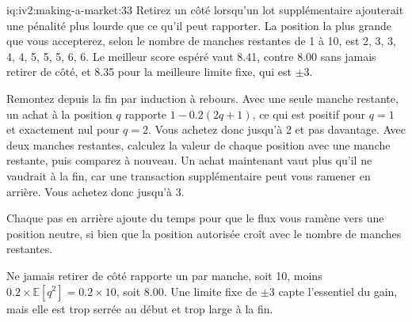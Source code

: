 \begin{solution}{iq:iv2:making-a-market:33}
Retirez un côté lorsqu'un lot supplémentaire ajouterait une pénalité plus lourde que ce qu'il peut rapporter. La position la plus grande que vous accepterez, selon le nombre de manches restantes de 1 à 10, est 2, 3, 3, 4, 4, 5, 5, 5, 6, 6. Le meilleur score espéré vaut 8.41, contre 8.00 sans jamais retirer de côté, et 8.35 pour la meilleure limite fixe, qui est $\pm 3$.

Remontez depuis la fin par induction à rebours. Avec une seule manche restante, un achat à la position $q$ rapporte $1 - 0.2(2q + 1)$, ce qui est positif pour $q = 1$ et exactement nul pour $q = 2$. Vous achetez donc jusqu'à 2 et pas davantage. Avec deux manches restantes, calculez la valeur de chaque position avec une manche restante, puis comparez à nouveau. Un achat maintenant vaut plus qu'il ne vaudrait à la fin, car une transaction supplémentaire peut vous ramener en arrière. Vous achetez donc jusqu'à 3.

Chaque pas en arrière ajoute du temps pour que le flux vous ramène vers une position neutre, si bien que la position autorisée croît avec le nombre de manches restantes.

Ne jamais retirer de côté rapporte un par manche, soit 10, moins $0.2 \times \mathbb{E}[q^2] = 0.2 \times 10$, soit 8.00. Une limite fixe de $\pm 3$ capte l'essentiel du gain, mais elle est trop serrée au début et trop large à la fin.

\end{solution}

